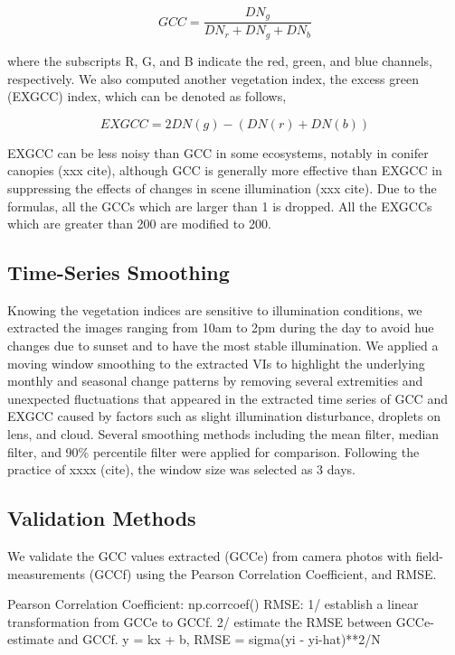 \documentclass{article}
\begin{document}
\begin{equation}
GCC = \frac{DN_g}{{DN_r + DN_g + DN_b}}
\end{equation}

where the subscripts R, G, and B indicate the red, green, and blue channels, respectively. 
We also computed another vegetation index, the excess green (EXGCC) index, which can be denoted as follows, 

\begin{equation}
EXGCC=2DN(g)-(DN(r)+DN(b)) 
\end{equation}

EXGCC can be less noisy than GCC in some ecosystems, notably in conifer canopies (xxx cite), although GCC is generally more effective than EXGCC in suppressing the effects of changes in scene illumination (xxx cite). Due to the formulas, all the GCCs which are larger than 1 is dropped. All the EXGCCs which are greater than 200 are modified to 200. 


\subsection{Time-Series Smoothing}
Knowing the vegetation indices are sensitive to illumination conditions, we extracted the images ranging from 10am to 2pm during the day to avoid hue changes due to sunset and to have the most stable illumination. We applied a moving window smoothing to the extracted VIs to highlight the underlying monthly and seasonal change patterns by removing several extremities and unexpected fluctuations that appeared in the extracted time series of GCC and EXGCC caused by factors such as slight illumination disturbance, droplets on lens, and cloud. Several smoothing methods including the mean filter, median filter, and 90\% percentile filter were applied for comparison. Following the practice of xxxx (cite), the window size was selected as 3 days. 


\subsection{Validation Methods}
We validate the GCC values extracted (GCCe) from camera photos with field-measurements (GCCf) using the Pearson Correlation Coefficient, and RMSE.    

Pearson Correlation Coefficient: np.corrcoef()
RMSE: 1/ establish a linear transformation from GCCe to GCCf. 2/ estimate the RMSE between GCCe-estimate and GCCf. y = kx + b, RMSE = sigma(yi - yi-hat)**2/N
\end{document}
